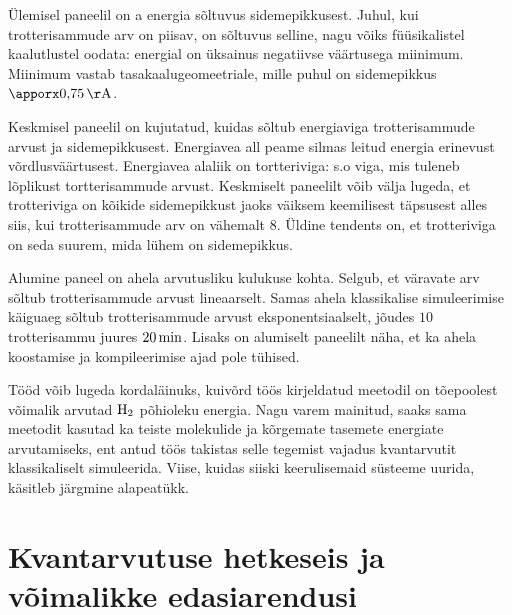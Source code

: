 \documentclass[12pt]{report}
\begin{document}
Ülemisel paneelil on a energia sõltuvus sidemepikkusest.
Juhul, kui trotterisammude arv on piisav, on sõltuvus selline, nagu võiks füüsikalistel kaalutlustel oodata: energial on üksainus negatiivse väärtusega miinimum.
Miinimum vastab tasakaalugeomeetriale, mille puhul on sidemepikkus \(\apporx0{,}75\,{\rm Å}\).

Keskmisel paneelil on kujutatud, kuidas sõltub energiaviga trotterisammude arvust ja sidemepikkusest.
Energiavea all peame silmas leitud energia erinevust võrdlusväärtusest.
Energiavea alaliik on tortteriviga: s.o viga, mis tuleneb lõplikust tortterisammude arvust.
Keskmiselt paneelilt võib välja lugeda, et trotteriviga on kõikide sidemepikkust jaoks väiksem keemilisest täpsusest alles siis, kui trotterisammude arv on vähemalt \(8\).
Üldine tendents on, et trotteriviga on seda suurem, mida lühem on sidemepikkus.

Alumine paneel on ahela arvutusliku kulukuse kohta.
Selgub, et väravate arv sõltub trotterisammude arvust lineaarselt.
Samas ahela klassikalise simuleerimise käiguaeg sõltub trotterisammude arvust eksponentsiaalselt, jõudes \(10\) trotterisammu juures \(20\,{\rm min}\).
Lisaks on alumiselt paneelilt näha, et ka ahela koostamise ja kompileerimise ajad pole tühised.

Tööd võib lugeda kordaläinuks, kuivõrd töös kirjeldatud meetodil on tõepoolest võimalik arvutad \(\rm H_2\) põhioleku energia.
Nagu varem mainitud, saaks sama meetodit kasutad ka teiste molekulide ja kõrgemate tasemete energiate arvutamiseks, ent antud töös takistas selle tegemist vajadus kvantarvutit klassikaliselt simuleerida.
Viise, kuidas siiski keerulisemaid süsteeme uurida, käsitleb järgmine alapeatükk.

\section{Kvantarvutuse hetkeseis ja võimalikke edasiarendusi}
\end{document}
